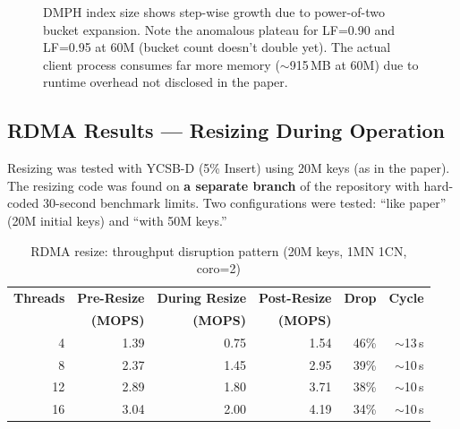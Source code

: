 \documentclass[11pt,a4paper]{article}
\begin{document}
\begin{figure}[H]
\centering
{}
\caption{DMPH index size shows step-wise growth due to power-of-two bucket expansion. Note the anomalous plateau for LF=0.90 and LF=0.95 at 60M (bucket count doesn't double yet). The actual client process consumes far more memory ($\sim$915\,MB at 60M) due to runtime overhead not disclosed in the paper.}
\label{fig:rdma-memory}
\end{figure}

\subsection{RDMA Results --- Resizing During Operation}

Resizing was tested with YCSB-D (5\% Insert) using 20M keys (as in the paper). The resizing code was found on \textbf{a separate branch} of the repository with hard-coded 30-second benchmark limits. Two configurations were tested: ``like paper'' (20M initial keys) and ``with 50M keys.''

\begin{table}[H]
\centering
\caption{RDMA resize: throughput disruption pattern (20M keys, 1MN 1CN, coro=2)}
\label{tab:rdma-resize}
\small
\begin{tabular}{@{}rrrrrr@{}}
\toprule
\textbf{Threads} & \textbf{Pre-Resize} & \textbf{During Resize} & \textbf{Post-Resize} & \textbf{Drop} & \textbf{Cycle} \\
 & \textbf{(MOPS)} & \textbf{(MOPS)} & \textbf{(MOPS)} & & \\
\midrule
4  & 1.39 & 0.75 & 1.54 & 46\% & $\sim$13\,s \\
8  & 2.37 & 1.45 & 2.95 & 39\% & $\sim$10\,s \\
12 & 2.89 & 1.80 & 3.71 & 38\% & $\sim$10\,s \\
16 & 3.04 & 2.00 & 4.19 & 34\% & $\sim$10\,s \\
\bottomrule
\end{tabular}
\end{table}
\end{document}
